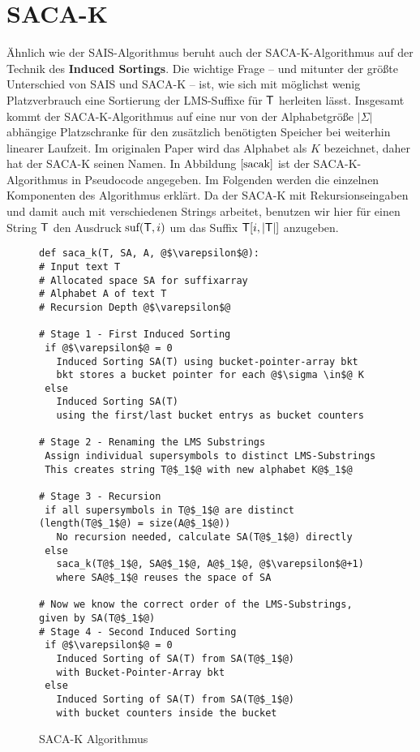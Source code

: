 \section{SACA-K}
\label{section:saca_k}

\newcommand {\suf} {\text{suf}}
\newcommand {\level} {\varepsilon}
\newcommand {\symbWidth} {0.3cm}

Ähnlich wie der SAIS-Algorithmus beruht auch der SACA-K-Algorithmus auf der Technik des \textbf{Induced Sortings}. Die wichtige Frage -- und mitunter der größte Unterschied von SAIS und SACA-K -- ist, wie sich mit möglichst wenig Platzverbrauch eine Sortierung der LMS-Suffixe für $\inputtext$ herleiten lässt. Insgesamt kommt der SACA-K-Algorithmus auf eine nur von der Alphabetgröße $|\Sigma|$ abhängige Platzschranke für den zusätzlich benötigten Speicher bei weiterhin linearer Laufzeit. Im originalen Paper wird das Alphabet als $K$ bezeichnet, daher hat der SACA-K seinen Namen. In Abbildung $\ref{sacak}$ ist der SACA-K-Algorithmus in Pseudocode angegeben. Im Folgenden werden die einzelnen Komponenten des Algorithmus erklärt. Da der SACA-K mit Rekursionseingaben und damit auch mit verschiedenen Strings arbeitet, benutzen wir hier für einen String $\inputtext$ den Ausdruck $\suf(\inputtext,i)$ um das Suffix $\inputtext{}[i,|\inputtext|]$ anzugeben.

\begin{figure}
\begin{verbatim}
def saca_k(T, SA, A, @$\varepsilon$@):
# Input text T
# Allocated space SA for suffixarray
# Alphabet A of text T
# Recursion Depth @$\varepsilon$@

# Stage 1 - First Induced Sorting
 if @$\varepsilon$@ = 0
   Induced Sorting SA(T) using bucket-pointer-array bkt 
   bkt stores a bucket pointer for each @$\sigma \in$@ K
 else
   Induced Sorting SA(T) 
   using the first/last bucket entrys as bucket counters
		
# Stage 2 - Renaming the LMS Substrings
 Assign individual supersymbols to distinct LMS-Substrings
 This creates string T@$_1$@ with new alphabet K@$_1$@
	
# Stage 3 - Recursion
 if all supersymbols in T@$_1$@ are distinct (length(T@$_1$@) = size(A@$_1$@))
   No recursion needed, calculate SA(T@$_1$@) directly
 else
   saca_k(T@$_1$@, SA@$_1$@, A@$_1$@, @$\varepsilon$@+1)
   where SA@$_1$@ reuses the space of SA

# Now we know the correct order of the LMS-Substrings, given by SA(T@$_1$@)
# Stage 4 - Second Induced Sorting
 if @$\varepsilon$@ = 0
   Induced Sorting of SA(T) from SA(T@$_1$@) 
   with Bucket-Pointer-Array bkt
 else
   Induced Sorting of SA(T) from SA(T@$_1$@) 
   with bucket counters inside the bucket

\end{verbatim}
\caption{SACA-K Algorithmus  \cite{saca:7}}
\label{sacak}
\end{figure}

